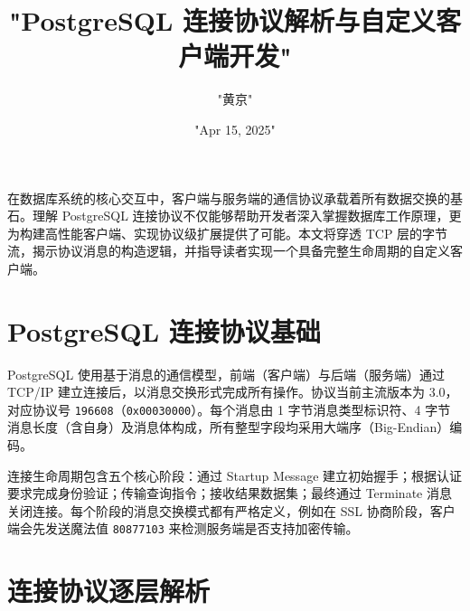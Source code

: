 \title{"PostgreSQL 连接协议解析与自定义客户端开发"}
\author{"黄京"}
\date{"Apr 15, 2025"}
\maketitle
在数据库系统的核心交互中，客户端与服务端的通信协议承载着所有数据交换的基石。理解 PostgreSQL 连接协议不仅能够帮助开发者深入掌握数据库工作原理，更为构建高性能客户端、实现协议级扩展提供了可能。本文将穿透 TCP 层的字节流，揭示协议消息的构造逻辑，并指导读者实现一个具备完整生命周期的自定义客户端。\par
\chapter{PostgreSQL 连接协议基础}
PostgreSQL 使用基于消息的通信模型，前端（客户端）与后端（服务端）通过 TCP/IP 建立连接后，以消息交换形式完成所有操作。协议当前主流版本为 3.0，对应协议号 \verb!196608!（\verb!0x00030000!）。每个消息由 1 字节消息类型标识符、4 字节消息长度（含自身）及消息体构成，所有整型字段均采用大端序（Big-Endian）编码。\par
连接生命周期包含五个核心阶段：通过 Startup Message 建立初始握手；根据认证要求完成身份验证；传输查询指令；接收结果数据集；最终通过 Terminate 消息关闭连接。每个阶段的消息交换模式都有严格定义，例如在 SSL 协商阶段，客户端会先发送魔法值 \verb!80877103! 来检测服务端是否支持加密传输。\par
\chapter{连接协议逐层解析}
